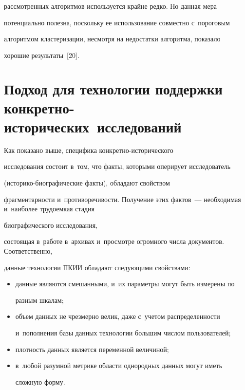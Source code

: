 рассмотренных алгоритмов используется крайне редко. Но данная мера 


потенциально полезна, поскольку ее использование совместно с~пороговым 


алгоритмом кластеризации, несмотря на недостатки алгоритма, показало 


хорошие результаты~[20].





\vspace*{-4pt}





\section{Подход для технологии поддержки конкретно-исторических~исследований}





\vspace*{-3pt}


  


  Как показано выше, специфика кон\-крет\-но-ис\-то\-ри\-че\-ско\-го 


исследования состоит в~том, что факты, которыми оперирует исследователь  


(ис\-то\-ри\-ко-био\-гра\-фи\-че\-ские факты), обладают свойством 


фрагментарности и~противоречивости. Получение этих фактов~--- необходимая и~наиболее трудоемкая стадия 


\mbox{биографического} исследования, 


состоящая в~работе в~архивах и~просмотре огромного числа документов. Соответственно, 


данные технологии ПКИИ обладают следующими свойствами:


  \begin{itemize}


  \item данные являются смешанными, и~их параметры могут быть измерены по 


разным шкалам;


  \item объем данных не чрезмерно велик, даже с~учетом распределенности 


  и~пополнения базы данных технологии большим числом пользователей;


  \item плотность данных является переменной величиной;


  \item в~любой разумной метрике области однородных данных могут иметь 


сложную форму.


  \end{itemize}



